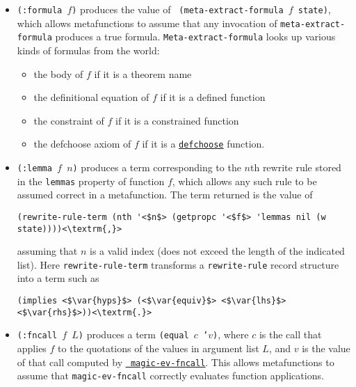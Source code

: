 \begin{itemize}

\item {\tt (:formula $f$)} produces the value of {\tt
    (meta-extract-formula $f$ state)}, which allows metafunctions to
  assume that any invocation of {\tt meta-extract-formula} produces a
  true formula.  {\tt Meta-extract-formula} looks up various kinds of
  formulas from the world:
  \begin{itemize}
  \item the body of $f$ if it is a theorem name
  \item the definitional equation of $f$ if it is a defined function
  \item the constraint of $f$ if it is a constrained function
  \item the defchoose axiom of $f$ if it is a \href{http://www.cs.utexas.edu/users/moore/acl2/manuals/current/manual/index.html?topic=ACL2\_\_\_\_DEFCHOOSE}{\underline{\tt defchoose}} function.
  \end{itemize}

\item {\tt (:lemma $f$ $n$)} produces a term corresponding to the
  $n$th rewrite rule stored in the {\tt lemmas} property of function
  $f$, which allows any such rule to be assumed correct in a
  metafunction.  The term returned is the value of
  \begin{lstlisting}[basicstyle=\linespread{0.4}\normalsize\ttfamily]
    (rewrite-rule-term (nth '<$n$> (getpropc '<$f$> 'lemmas nil (w state))))<\textrm{,}>
  \end{lstlisting}
  assuming that $n$ is a valid index (does not exceed
  the length of the indicated list).  Here {\tt rewrite-\allowbreak{}rule-\allowbreak{}term}
  transforms a {\tt rewrite-rule} record structure into a term such as
  \begin{lstlisting}[basicstyle=\linespread{0.4}\normalsize\ttfamily]
    (implies <$\var{hyps}$> (<$\var{equiv}$> <$\var{lhs}$> <$\var{rhs}$>))<\textrm{.}>
  \end{lstlisting}

\item {\tt (:fncall $f$ $L$)} produces a term {\tt (equal $c$ '$v$)}, where
    $c$ is the call that applies $f$ to the quotations of the values in argument list $L$, and $v$ is
    the value of that call computed by
    \href{http://www.cs.utexas.edu/users/moore/acl2/manuals/current/manual/index.html?topic=ACL2\_\_\_\_MAGIC-EV-FNCALL}{\underline{\tt
        magic-\allowbreak{}ev-\allowbreak{}fncall}}.  This allows
    metafunctions to assume that {\tt magic-ev-fncall}
    correctly evaluates function applications.

\end{itemize}

